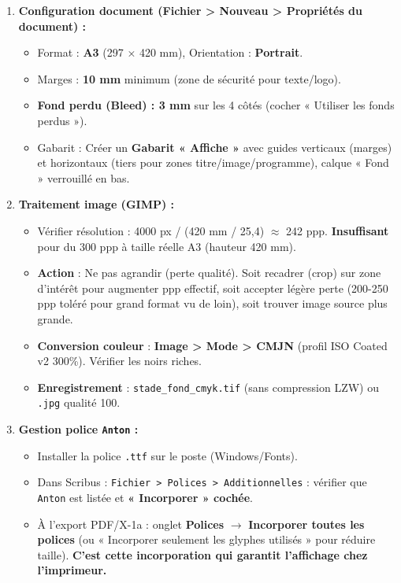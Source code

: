 \documentclass[11pt]{article}
\begin{document}
\begin{corrige}
\begin{enumerate}
    \item \textbf{Configuration document (Fichier > Nouveau > Propriétés du document) :}
        \begin{itemize}
            \item Format : \textbf{A3} (297 × 420 mm), Orientation : \textbf{Portrait}.
            \item Marges : \textbf{10 mm} minimum (zone de sécurité pour texte/logo).
            \item \textbf{Fond perdu (Bleed) : 3 mm} sur les 4 côtés (cocher « Utiliser les fonds perdus »).
            \item Gabarit : Créer un \textbf{Gabarit « Affiche »} avec guides verticaux (marges) et horizontaux (tiers pour zones titre/image/programme), calque « Fond » verrouillé en bas.
        \end{itemize}
    \item \textbf{Traitement image (GIMP) :}
        \begin{itemize}
            \item Vérifier résolution : 4000 px / (420 mm / 25,4) $\approx$ 242 ppp. \textbf{Insuffisant} pour du 300 ppp à taille réelle A3 (hauteur 420 mm). 
            \item \textbf{Action} : Ne pas agrandir (perte qualité). Soit recadrer (crop) sur zone d'intérêt pour augmenter ppp effectif, soit accepter légère perte (200-250 ppp toléré pour grand format vu de loin), soit trouver image source plus grande.
            \item \textbf{Conversion couleur} : \textbf{Image > Mode > CMJN} (profil ISO Coated v2 300\%). Vérifier les noirs riches.
            \item \textbf{Enregistrement} : \texttt{stade\_fond\_cmyk.tif} (sans compression LZW) ou \texttt{.jpg} qualité 100.
        \end{itemize}
    \item \textbf{Gestion police \texttt{Anton} :}
        \begin{itemize}
            \item Installer la police \texttt{.ttf} sur le poste (Windows/Fonts).
            \item Dans Scribus : \texttt{Fichier > Polices > Additionnelles} : vérifier que \texttt{Anton} est listée et \textbf{« Incorporer » cochée}.
            \item À l'export PDF/X-1a : onglet \textbf{Polices} $\rightarrow$ \textbf{Incorporer toutes les polices} (ou « Incorporer seulement les glyphes utilisés » pour réduire taille). \textbf{C'est cette incorporation qui garantit l'affichage chez l'imprimeur.}

\end{itemize}
\end{enumerate}
\end{corrige}
\end{document}
